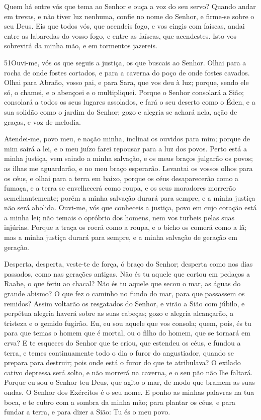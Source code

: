 Quem há entre vós que tema ao Senhor e ouça a voz do seu servo?
Quando andar em trevas, e não tiver luz nenhuma, confie no nome do
Senhor, e firme-se sobre o seu Deus. Eis que todos vós, que
acendeis fogo, e vos cingis com faíscas, andai entre as labaredas do
vosso fogo, e entre as faíscas, que acendestes. Isto vos sobrevirá
da minha mão, e em tormentos jazereis.

\medskip

\lettrine{51}{}Ouvi-me, vós os que seguis a justiça, os que
buscais ao Senhor. Olhai para a rocha de onde fostes cortados, e
para a caverna do poço de onde fostes cavados. Olhai para
Abraão, vosso pai, e para Sara, que vos deu à luz; porque, sendo ele
só, o chamei, e o abençoei e o multipliquei. Porque o Senhor
consolará a Sião; consolará a todos os seus lugares assolados, e
fará o seu deserto como o Éden, e a sua solidão como o jardim do
Senhor; gozo e alegria se achará nela, ação de graças, e voz de
melodia.

Atendei-me, povo meu, e nação minha, inclinai os ouvidos para mim;
porque de mim sairá a lei, e o meu juízo farei repousar para a luz
dos povos. Perto está a minha justiça, vem saindo a minha
salvação, e os meus braços julgarão os povos; as ilhas me
aguardarão, e no meu braço esperarão. Levantai os vossos olhos
para os céus, e olhai para a terra em baixo, porque os céus
desaparecerão como a fumaça, e a terra se envelhecerá como roupa, e
os seus moradores morrerão semelhantemente; porém a minha salvação
durará para sempre, e a minha justiça não será abolida. Ouvi-me,
vós que conheceis a justiça, povo em cujo coração está a minha lei;
não temais o opróbrio dos homens, nem vos turbeis pelas suas
injúrias. Porque a traça os roerá como a roupa, e o bicho os
comerá como a lã; mas a minha justiça durará para sempre, e a minha
salvação de geração em geração.

Desperta, desperta, veste-te de força, ó braço do Senhor; desperta
como nos dias passados, como nas gerações antigas. Não és tu aquele
que cortou em pedaços a Raabe, o que feriu ao chacal? Não és
tu aquele que secou o mar, as águas do grande abismo? O que fez o
caminho no fundo do mar, para que passassem os remidos? Assim
voltarão os resgatados do Senhor, e virão a Sião com júbilo, e
perpétua alegria haverá sobre as suas cabeças; gozo e alegria
alcançarão, a tristeza e o gemido fugirão. Eu, eu sou aquele
que vos consola; quem, pois, és tu para que temas o homem que é
mortal, ou o filho do homem, que se tornará em erva? E te
esqueces do Senhor que te criou, que estendeu os céus, e fundou a
terra, e temes continuamente todo o dia o furor do angustiador,
quando se prepara para destruir; pois onde está o furor do que te
atribulava? O exilado cativo depressa será solto, e não
morrerá na caverna, e o seu pão não lhe faltará. Porque eu
sou o Senhor teu Deus, que agito o mar, de modo que bramem as suas
ondas. O Senhor dos Exércitos é o seu nome. E ponho as minhas
palavras na tua boca, e te cubro com a sombra da minha mão; para
plantar os céus, e para fundar a terra, e para dizer a Sião: Tu és o
meu povo.

